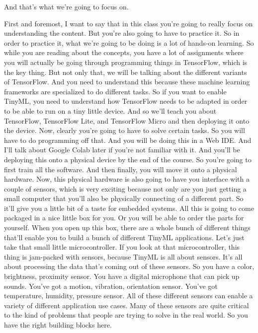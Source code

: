 And that's what we're going to focus on.


First and foremost, I want to say that in this class you're going to really focus on understanding the content.
But you're also going to have to practice it.
So in order to practice it, what we're going to be doing is a lot of hands-on learning.
So while you are reading about the concepts, you have a lot of assignments where you will actually be going through programming things in TensorFlow, which is the key thing.
But not only that, we will be talking about the different variants of TensorFlow.
And you need to understand this because these machine learning frameworks are specialized to do different tasks.
So if you want to enable TinyML, you need to understand how TensorFlow needs to be adapted in order to be able to run on a tiny little device.
And so we'll teach you about TensorFlow, TensorFlow Lite, and TensorFlow  Micro  and then deploying it onto the device.
Now, clearly you're going to have to solve certain tasks.
So you will have to do programming off that.
And you will be doing this in a Web IDE.
And I'll talk about Google Colab later if you're not familiar with it.
And you'll be deploying this onto a physical device by the end of the course.
So you're going to first train all the software.
And then finally, you will move it onto a physical hardware.
Now, this physical hardware is also going to have you interface with a couple of sensors, which is very exciting because not only are you just getting a small computer that you'll also be physically connecting of a different part.
So it'll give you a little bit of a taste for embedded systems.
All this is going to come packaged in a nice little box for you.
Or you will be able to order the parts for yourself.
When you open up this box, there are a whole bunch of different things that'll enable you to build a bunch of different TinyML applications.
Let's just take that small little microcontroller.
If you look at that microcontroller, this thing is jam-packed with sensors, because TinyML is all about sensors.
It's all about processing the data that's coming out of these sensors.
So you have a color, brightness, proximity sensor.
You have a digital microphone that can pick up sounds.
You've got a motion, vibration, orientation sensor.
You've got temperature, humidity, pressure sensor.
All of these different sensors can enable a variety of different application use cases.
Many of these sensors are quite critical to the kind of problems that people are trying to solve in the real world.
So you have the right building blocks here.
